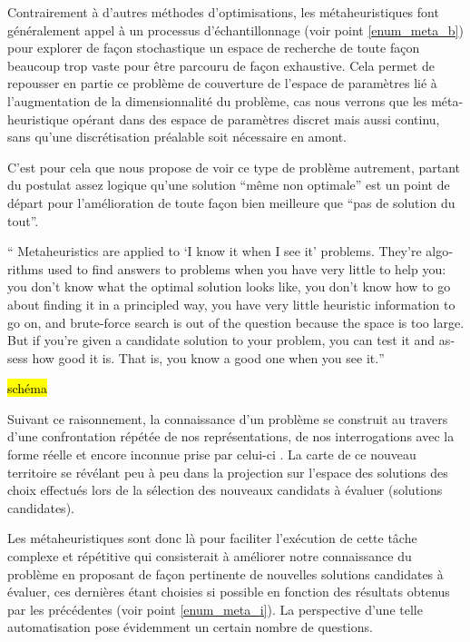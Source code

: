 


Contrairement à d'autres méthodes d'optimisations, les métaheuristiques font généralement appel à un processus d'échantillonnage (voir point \ref{enum_meta_b}) pour explorer de façon stochastique un espace de recherche de toute façon beaucoup trop vaste pour être parcouru de façon exhaustive. Cela permet de repousser en partie ce problème de couverture de l'espace de paramètres lié à l'augmentation de la dimensionnalité du problème, cas nous verrons que les méta-heuristique opérant dans des espace de paramètres discret mais aussi continu, sans qu'une discrétisation préalable soit nécessaire en amont.

C'est pour cela que \textcite[7]{Luke2013} nous propose de voir ce type de problème autrement, partant du postulat assez logique qu'une solution \enquote{même non optimale} est un point de départ pour l'amélioration de toute façon bien meilleure que \enquote{pas de solution du tout}.

\foreignquote{english}{ Metaheuristics are applied to \enquote{I know it when I see it} problems. They're algorithms used to find answers to problems when you have very little to help you: you don't know what the optimal solution looks like, you don't know how to go about finding it in a principled way, you have very little heuristic information to go on, and brute-force search is out of the question because the space is too large. But if you're given a candidate solution to your problem, you can test it and assess how good it is. That is, you know a good one when you see it.}

\hl{schéma}

Suivant ce raisonnement, la connaissance d'un problème se construit au travers d'une confrontation répétée de nos représentations, de nos interrogations avec la forme réelle et encore inconnue prise par celui-ci . La carte de ce nouveau territoire se révélant peu à peu dans la projection sur l'espace des solutions des choix effectués lors de la sélection des nouveaux candidats à évaluer (solutions candidates). 

Les métaheuristiques sont donc là pour faciliter l'exécution de cette tâche complexe et répétitive qui consisterait à améliorer notre connaissance du problème en proposant de façon pertinente de nouvelles solutions candidates à évaluer, ces dernières étant choisies si possible en fonction des résultats obtenus par les précédentes (voir point \ref{enum_meta_i}). La perspective d'une telle automatisation pose évidemment un certain nombre de questions.

